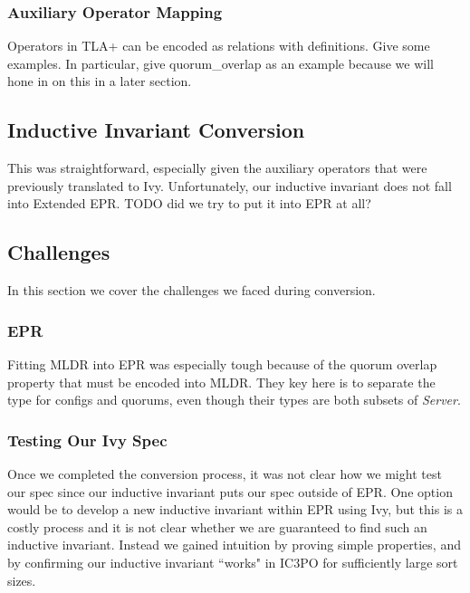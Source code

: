 \documentclass[12pt]{article}
\begin{document}
\subsubsection{Auxiliary Operator Mapping}

Operators in TLA+ can be encoded as relations with definitions.  Give some examples.  In particular, give quorum\_overlap as an example because we will hone in on this in a later section.


\subsection{Inductive Invariant Conversion}

This was straightforward, especially given the auxiliary operators that were previously translated to Ivy.  Unfortunately, our inductive invariant does not fall into Extended EPR.  TODO did we try to put it into EPR at all?


\subsection{Challenges}

In this section we cover the challenges we faced during conversion.

\subsubsection{EPR}

Fitting MLDR into EPR was especially tough because of the quorum overlap property that must be encoded into MLDR.  They key here is to separate the type for configs and quorums, even though their types are both subsets of \textit{Server}.

\subsubsection{Testing Our Ivy Spec}

Once we completed the conversion process, it was not clear how we might test our spec since our inductive invariant puts our spec outside of EPR.  One option would be to develop a new inductive invariant within EPR using Ivy, but this is a costly process and it is not clear whether we are guaranteed to find such an inductive invariant.  Instead we gained intuition by proving simple properties, and by confirming our inductive invariant ``works" in IC3PO for sufficiently large sort sizes.




\end{document}
